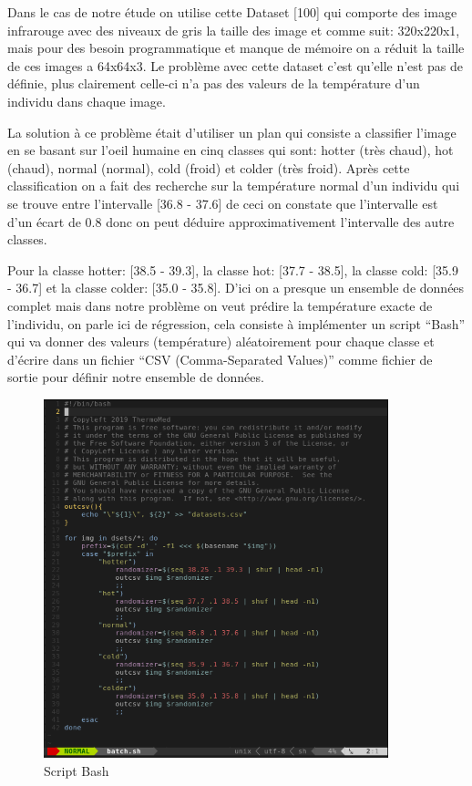 \documentclass[12pt]{article}
\begin{document}
Dans le cas de notre étude on utilise cette Dataset [100] qui comporte des image infrarouge avec des niveaux de gris la taille des image et comme suit: 320x220x1, mais pour des besoin programmatique et manque de mémoire on a réduit la taille de ces images a 64x64x3. Le problème avec cette dataset c’est qu’elle n’est pas de définie, plus clairement celle-ci n’a pas des valeurs de la température d’un individu dans chaque image.

La solution à ce problème était d’utiliser un plan qui consiste a classifier l’image en se basant sur l’oeil humaine en cinq classes qui sont: hotter (très chaud), hot (chaud), normal (normal), cold (froid) et colder (très froid). Après cette classification on a fait des recherche sur la température normal d’un individu qui se trouve entre l’intervalle [36.8 - 37.6] de ceci on constate que l’intervalle est d’un écart de 0.8 donc on peut déduire approximativement l’intervalle des autre classes.

Pour la classe hotter: [38.5 - 39.3], la classe hot: [37.7 - 38.5], la classe cold: [35.9 - 36.7] et la classe colder: [35.0 - 35.8]. D’ici on a presque un ensemble de données complet mais dans notre problème on veut prédire la température exacte de l’individu, on parle ici de régression, cela consiste à implémenter un script “Bash” qui va donner des valeurs (température) aléatoirement pour chaque classe et d’écrire dans un fichier “CSV (Comma-Separated Values)” comme fichier de sortie pour définir notre ensemble de données.

\begin{figure}[h]
	\centering
	\includegraphics[width=10cm]{img-Chapiter-4/batch.png}
	\caption{Script Bash}
\end{figure}
\end{document}
